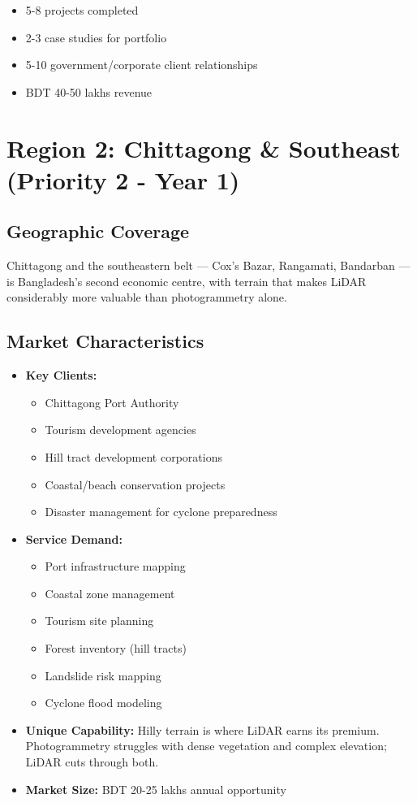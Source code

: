 \begin{itemize}
    \item 5-8 projects completed
    \item 2-3 case studies for portfolio
    \item 5-10 government/corporate client relationships
    \item BDT 40-50 lakhs revenue
\end{itemize}

\section{Region 2: Chittagong \& Southeast (Priority 2 - Year 1)}

\subsection{Geographic Coverage}

Chittagong and the southeastern belt --- Cox's Bazar, Rangamati, Bandarban --- is Bangladesh's second economic centre, with terrain that makes LiDAR considerably more valuable than photogrammetry alone.

\subsection{Market Characteristics}

\begin{itemize}
    \item \textbf{Key Clients:}
    \begin{itemize}
        \item Chittagong Port Authority
        \item Tourism development agencies
        \item Hill tract development corporations
        \item Coastal/beach conservation projects
        \item Disaster management for cyclone preparedness
    \end{itemize}

    \item \textbf{Service Demand:}
    \begin{itemize}
        \item Port infrastructure mapping
        \item Coastal zone management
        \item Tourism site planning
        \item Forest inventory (hill tracts)
        \item Landslide risk mapping
        \item Cyclone flood modeling
    \end{itemize}

    \item \textbf{Unique Capability:} Hilly terrain is where LiDAR earns its premium. Photogrammetry struggles with dense vegetation and complex elevation; LiDAR cuts through both.

    \item \textbf{Market Size:} BDT 20-25 lakhs annual opportunity
\end{itemize}

